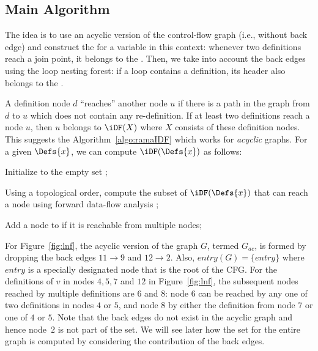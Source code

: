 {\subsection{Main Algorithm}

The idea is to use an acyclic version of the control-flow graph (i.e., without 
back edge) and construct the \iDF for a variable in this context: whenever two 
definitions reach a join point, it belongs to the \iDF. Then, we take into 
account the back edges using the loop nesting forest: if a loop contains a 
definition, its header also belongs to the \iDF.

\medskip
    
A definition node $d$ ``reaches'' another node $u$ if there is a path in the 
graph from $d$ to $u$ which does not contain any re-definition. If at least two 
definitions reach a node $u$, then $u$ belongs to $\iDF(X)$ where $X$ consists 
of these definition nodes. This suggests the Algorithm~\ref{algo:ramaIDF} which 
works for \emph{acyclic} graphs.
For a given $\Defs{x}$, we can compute $\iDF(\Defs{x})$ as follows:

\begin{itemize}
\item { Initialize \iDF to the empty set };
\item { Using a topological order, compute the subset of $\iDF(\Defs{x})$ that can reach a node using forward data-flow analysis };
{\item} {Add a node to \iDF if it is reachable from multiple nodes};
\end{itemize}  

For Figure~\ref{fig:lnf}, the acyclic version of the graph $G$, termed 
$G_{\textit{ac}}$, is formed by dropping the back edges $11 \rightarrow 9$ and $12 
\rightarrow 2$. Also, $\textit{entry}(G) = \{\textit{entry}\}$ where 
$\textit{entry}$ is a specially designated node that is the root of the 
CFG. For the definitions of $v$ in nodes $4,5,7$ and $12$ in 
Figure~\ref{fig:lnf}, the subsequent nodes reached by multiple definitions 
are $6$ and $8$: node $6$ can be reached by any one of two definitions in 
nodes $4$ or $5$, and node $8$ by either the definition from node 
$7$ or one of $4$ or $5$. Note that the back edges do not exist in the 
acyclic graph and hence node~$2$ is not part of the \iDF set. We will see 
later how the \iDF set for the entire graph is computed by considering the 
contribution of the back edges. 




}
